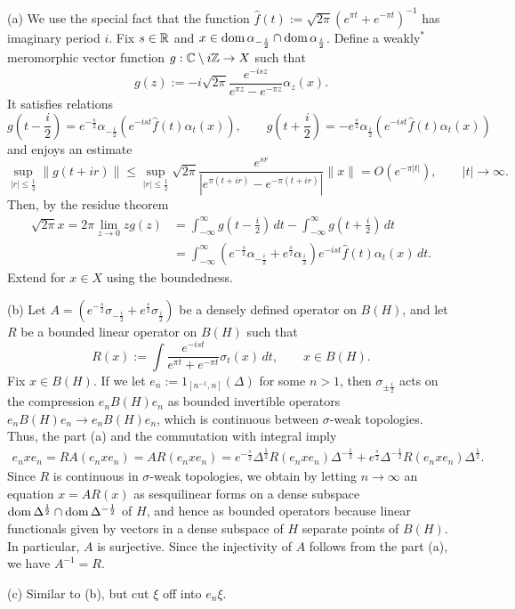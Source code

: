 \documentclass{../../small}
\begin{document}
\begin{pf}
(a)
We use the special fact that the function $\hat f(t):=\sqrt{2\pi}(e^{\pi t}+e^{-\pi t})^{-1}$ has imaginary period $i$.
Fix $s\in\mathbb{R}$ and $x\in\operatorname{dom}\alpha_{-\frac i2}\cap\operatorname{dom}\alpha_{\frac i2}$.
Define a weakly$^*$ meromorphic vector function $g:\mathbb{C}\setminus i\mathbb{Z}\to X$ such that
\[g(z):=-i\sqrt{2\pi}\frac{e^{-isz}}{e^{\pi z}-e^{-\pi z}}\alpha_z(x).\]
It satisfies relations
\[g(t-\frac i2)=e^{-\frac s2}\alpha_{-\frac i2}(e^{-ist}\hat f(t)\alpha_t(x)),\qquad
g(t+\frac i2)=-e^{\frac s2}\alpha_{\frac i2}(e^{-ist}\hat f(t)\alpha_t(x))\]
and enjoys an estimate
\[\sup_{|r|\le\frac12}\|g(t+ir)\|\le\sup_{|r|\le\frac12}\sqrt{2\pi}\frac{e^{sr}}{|e^{\pi(t+ir)}-e^{-\pi(t+ir)}|}\|x\|=O(e^{-\pi|t|}),\qquad|t|\to\infty.\]
Then, by the residue theorem
\begin{align*}
\sqrt{2\pi}x=2\pi\lim_{z\to0}zg(z)
&=\int_{-\infty}^\infty g(t-\frac i2)\,dt-\int_{-\infty}^\infty g(t+\frac i2)\,dt\\
&=\int_{-\infty}^\infty(e^{-\frac s2}\alpha_{-\frac i2}+e^{\frac s2}\alpha_{\frac i2})e^{-ist}\hat f(t)\alpha_t(x)\,dt.
\end{align*}
Extend for $x\in X$ using the boundedness.

(b)
Let $A=(e^{-\frac s2}\sigma_{-\frac i2}+e^{\frac s2}\sigma_{\frac i2})$ be a densely defined operator on $B(H)$, and let $R$ be a bounded linear operator on $B(H)$ such that
\[R(x):=\int\frac{e^{-ist}}{e^{\pi t}+e^{-\pi t}}\sigma_t(x)\,dt,\qquad x\in B(H).\]
Fix $x\in B(H)$.
If we let $e_n:=1_{[n^{-1},n]}(\Delta)$ for some $n>1$, then $\sigma_{\pm\frac i2}$ acts on the compression $e_nB(H)e_n$ as bounded invertible operators $e_nB(H)e_n\to e_nB(H)e_n$, which is continuous between $\sigma$-weak topologies.
Thus, the part (a) and the commutation with integral imply
\begin{align*}
e_nxe_n=RA(e_nxe_n)=AR(e_nxe_n)=e^{-\frac s2}\Delta^{\frac12}R(e_nxe_n)\Delta^{-\frac12}+e^{\frac s2}\Delta^{-\frac12}R(e_nxe_n)\Delta^{\frac12}.
\end{align*}
Since $R$ is continuous in $\sigma$-weak topologies, we obtain by letting $n\to\infty$ an equation $x=AR(x)$ as sesquilinear forms on a dense subspace $\operatorname{dom}\Delta^{\frac12}\cap\operatorname{dom}\Delta^{-\frac12}$ of $H$, and hence as bounded operators because linear functionals given by vectors in a dense subspace of $H$ separate points of $B(H)$.
In particular, $A$ is surjective.
Since the injectivity of $A$ follows from the part (a), we have $A^{-1}=R$.

(c)
Similar to (b), but cut $\xi$ off into $e_n\xi$.
\end{pf}
\end{document}
